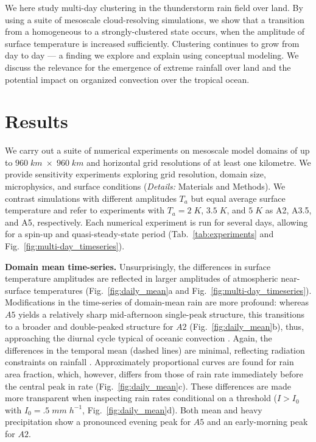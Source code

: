 \documentclass[draft,linenumbers]{agujournal2019}
\begin{document}
We here study multi-day clustering in the thunderstorm rain field over land. 
By using a suite of mesoscale cloud-resolving simulations, we show that a transition from a homogeneous to a strongly-clustered state occurs, when the amplitude of surface temperature is increased sufficiently. 
Clustering continues to grow from day to day --- a finding we explore and explain using conceptual modeling.
We discuss the relevance for the emergence of extreme rainfall over land and the potential impact on organized convection over the tropical ocean.

\section*{Results}\label{sec:results}
\noindent
We carry out a suite of numerical experiments on mesoscale model domains of up to $960\;km\;\times\;960\;km$ and horizontal grid resolutions of at least one kilometre. We provide sensitivity experiments exploring grid resolution, domain size, microphysics, and surface conditions ({\it Details:} Materials and Methods).
We contrast simulations with different amplitudes $T_a$ but equal average surface temperature and refer to experiments with $T_a=2\;K$, $3.5\;K$, and $5\;K$ as A2, A3.5, and A5, respectively.
Each numerical experiment is run for several days, allowing for a spin-up and quasi-steady-state period (Tab.~\ref{tab:experiments} and Fig.~\ref{fig:multi-day_timeseries}). 

\noindent
{\bf Domain mean time-series.}
Unsurprisingly, the differences in surface temperature amplitudes are reflected in larger amplitudes of atmospheric near-surface temperatures (Fig.~\ref{fig:daily_mean}a and Fig.~\ref{fig:multi-day_timeseries}).
Modifications in the time-series of domain-mean rain are more profound: whereas $A5$ yields a relatively sharp mid-afternoon single-peak structure, this transitions to a broader and double-peaked structure for $A2$ (Fig.~\ref{fig:daily_mean}b),
thus, approaching the diurnal cycle typical of oceanic convection \cite{yang2001diurnal}.
Again, the differences in the temporal mean (dashed lines) are minimal, reflecting radiation constraints on rainfall \cite{held2006robust}.
Approximately proportional curves are found for rain area fraction, which, however, differs from those of rain rate immediately before the central peak in rate (Fig.~\ref{fig:daily_mean}c).
These differences are made more transparent when inspecting rain rates conditional on a threshold ($I>I_0$ with $I_0=.5\;mm\;h^{-1}$, Fig.~\ref{fig:daily_mean}d). 
Both mean and heavy precipitation show a pronounced evening peak for $A5$ and an early-morning peak for $A2$.
\end{document}
